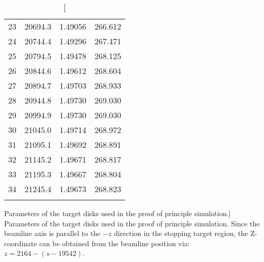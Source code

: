 {\begin{table}[tb]
\begin{tabular}{|r|S[table-format=5.1]S[table-format=1.5]S[table-format=3.3]|}
23 & 20694.3 & 1.49056 & 266.612 \\
24 & 20744.4 & 1.49296 & 267.471 \\
25 & 20794.5 & 1.49478 & 268.125 \\
26 & 20844.6 & 1.49612 & 268.604 \\
27 & 20894.7 & 1.49703 & 268.933 \\
28 & 20944.8 & 1.49730 & 269.030 \\
29 & 20994.9 & 1.49730 & 269.030 \\
30 & 21045.0 & 1.49714 & 268.972 \\
31 & 21095.1 & 1.49692 & 268.891 \\
32 & 21145.2 & 1.49671 & 268.817 \\
33 & 21195.3 & 1.49667 & 268.804 \\
34 & 21245.4 & 1.49673 & 268.823 \\
   &         &         &         \\
\hline
\end{tabular}
\caption
[Parameters of the target disks used in the proof of principle simulation.]{
Parameters of the target disks used in the proof of principle simulation.
Since the beamline axis is parallel to the $-z$ direction in the stopping target region, the Z-coordinate can be obtained from the beamline position via: $z=2164-(s-19542)$.
}
\end{table}
}

\newcommand{\FigTgtImprovFieldVsBeamline}{
\begin{figure}[tb]
\texttt{[image: figs/appendixStopTgtImprov/Plot\_FieldMagnitude.pdf]}
\caption
[The magnitude of the magnetic field around the stopping target.]{
The magnitude of the magnetic field around the stopping target.
The vertical grey lines indicate the position of the stopping target disks and beam blocker in the target design used in chapter~\sect{sense}.
The muon beam arrives from the left, and signal electrons should leave to the right.
\figlabel{app:tgtImprov:field}}
\end{figure}
}

